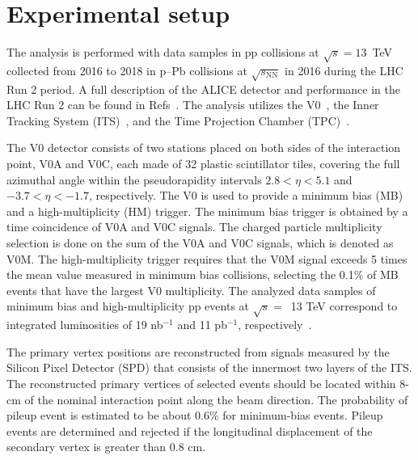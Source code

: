

\section{Experimental setup}
\label{sec:experiment}
\label{sec:experiment}

The analysis is performed with data samples in pp collisions at $\sqrt{s} = 13$~TeV collected from 2016 to 2018 in p--Pb collisions at $\sqrt{s_\mathrm{NN}}$ in 2016 during the LHC Run 2 period. A full description of the ALICE detector and performance in the LHC Run 2 can be found in Refs~\cite{Aamodt:2008zz,Abelev:2014ffa}. The analysis utilizes the V0~\cite{Abbas:2013taa}, the Inner Tracking System (ITS)~\cite{aliceITS}, and the Time Projection Chamber (TPC)~\cite{aliceTPC}. 

The V0 detector consists of two stations placed on both sides of the interaction point, V0A and V0C, each made of 32 plastic scintillator tiles, covering the full azimuthal angle within the pseudorapidity intervals $2.8 < \eta < 5.1$ and $-3.7 < \eta < -1.7$, respectively. The V0 is used to provide a minimum bias (MB) and a high-multiplicity (HM) trigger. The minimum bias trigger is obtained by a time coincidence of V0A and V0C signals. The charged particle multiplicity selection is done on the sum of the V0A and V0C signals, which is denoted as V0M. The high-multiplicity trigger requires that the V0M signal exceeds 5 times the mean value measured in minimum bias collisions, selecting the 0.1\% of MB events that have the largest V0 multiplicity. The analyzed data samples of minimum bias and high-multiplicity pp events at $\sqrt{s}=$~13 TeV correspond to integrated luminosities of 19 nb$^{-1}$ and 11 pb$^{-1}$, respectively~\cite{ALICE-PUBLIC-2016-002}.

The primary vertex positions are reconstructed from signals measured by the Silicon Pixel Detector (SPD) that consists of the innermost two layers of the ITS. The reconstructed primary vertices of selected events should be located within 8-cm of the nominal interaction point along the beam direction. The probability of pileup event is estimated to be about 0.6\% for minimum-bias events. Pileup events are determined and rejected if the longitudinal displacement of the secondary vertex is greater than 0.8 cm. 

